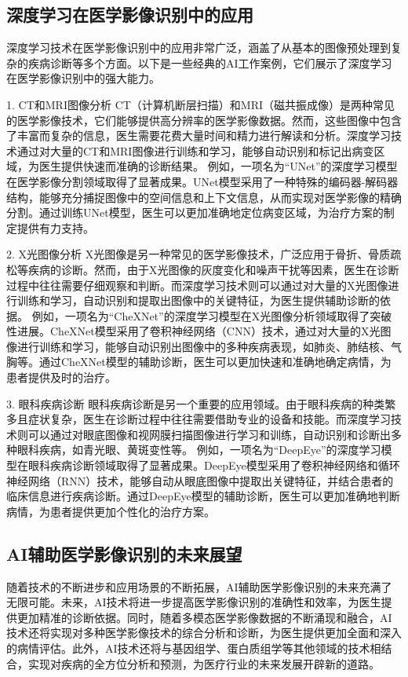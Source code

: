 \subsection{深度学习在医学影像识别中的应用}
深度学习技术在医学影像识别中的应用非常广泛，涵盖了从基本的图像预处理到复杂的疾病诊断等多个方面。以下是一些经典的AI工作案例，它们展示了深度学习在医学影像识别中的强大能力。

1. CT和MRI图像分析
CT（计算机断层扫描）和MRI（磁共振成像）是两种常见的医学影像技术，它们能够提供高分辨率的医学影像数据。然而，这些图像中包含了丰富而复杂的信息，医生需要花费大量时间和精力进行解读和分析。深度学习技术通过对大量的CT和MRI图像进行训练和学习，能够自动识别和标记出病变区域，为医生提供快速而准确的诊断结果。
例如，一项名为“UNet”的深度学习模型在医学影像分割领域取得了显著成果。UNet模型采用了一种特殊的编码器-解码器结构，能够充分捕捉图像中的空间信息和上下文信息，从而实现对医学影像的精确分割。通过训练UNet模型，医生可以更加准确地定位病变区域，为治疗方案的制定提供有力支持。

2. X光图像分析
X光图像是另一种常见的医学影像技术，广泛应用于骨折、骨质疏松等疾病的诊断。然而，由于X光图像的灰度变化和噪声干扰等因素，医生在诊断过程中往往需要仔细观察和判断。而深度学习技术则可以通过对大量的X光图像进行训练和学习，自动识别和提取出图像中的关键特征，为医生提供辅助诊断的依据。
例如，一项名为“CheXNet”的深度学习模型在X光图像分析领域取得了突破性进展。CheXNet模型采用了卷积神经网络（CNN）技术，通过对大量的X光图像进行训练和学习，能够自动识别出图像中的多种疾病表现，如肺炎、肺结核、气胸等。通过CheXNet模型的辅助诊断，医生可以更加快速和准确地确定病情，为患者提供及时的治疗。

3. 眼科疾病诊断
眼科疾病诊断是另一个重要的应用领域。由于眼科疾病的种类繁多且症状复杂，医生在诊断过程中往往需要借助专业的设备和技能。而深度学习技术则可以通过对眼底图像和视网膜扫描图像进行学习和训练，自动识别和诊断出多种眼科疾病，如青光眼、黄斑变性等。
例如，一项名为“DeepEye”的深度学习模型在眼科疾病诊断领域取得了显著成果。DeepEye模型采用了卷积神经网络和循环神经网络（RNN）技术，能够自动从眼底图像中提取出关键特征，并结合患者的临床信息进行疾病诊断。通过DeepEye模型的辅助诊断，医生可以更加准确地判断病情，为患者提供更加个性化的治疗方案。

\subsection{AI辅助医学影像识别的未来展望}
随着技术的不断进步和应用场景的不断拓展，AI辅助医学影像识别的未来充满了无限可能。未来，AI技术将进一步提高医学影像识别的准确性和效率，为医生提供更加精准的诊断依据。同时，随着多模态医学影像数据的不断涌现和融合，AI技术还将实现对多种医学影像技术的综合分析和诊断，为医生提供更加全面和深入的病情评估。此外，AI技术还将与基因组学、蛋白质组学等其他领域的技术相结合，实现对疾病的全方位分析和预测，为医疗行业的未来发展开辟新的道路。


